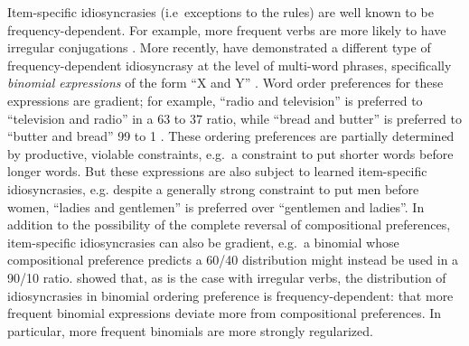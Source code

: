 \documentclass{evolang11}
\begin{document}
Item-specific idiosyncrasies (i.e\ exceptions to the rules) are well known to be frequency-dependent. For example, more frequent verbs are more likely to have irregular conjugations \cite{Lieberman:2007bl}.
More recently,  have demonstrated a different type of frequency-dependent idiosyncrasy at the level of multi-word phrases, specifically \emph{binomial expressions} of the form ``X and Y'' \cite{Cooper:1975uz,Benor:2006gv}. Word order preferences for these expressions are gradient; for example, ``radio and television'' is preferred to ``television and radio'' in a 63 to 37 ratio, while ``bread and butter'' is preferred to ``butter and bread'' 99 to 1 \cite{Lin:2012te}. These ordering preferences are partially determined by productive, violable constraints, e.g.\ a constraint to put shorter words before longer words. But these expressions are also subject to learned item-specific idiosyncrasies, e.g. despite a generally strong constraint to put men before women, ``ladies and gentlemen'' is preferred over ``gentlemen and ladies''. In addition to the possibility of the complete reversal of compositional preferences, item-specific idiosyncrasies can also be gradient, e.g.\ a binomial whose compositional preference predicts a 60/40 distribution might instead be used in a 90/10 ratio. 
%
 showed that, as is the case  with irregular verbs, the distribution of idiosyncrasies in binomial ordering preference is frequency-dependent: that more frequent binomial expressions deviate more from compositional preferences.  In particular, more frequent binomials are more strongly regularized.
\end{document}
